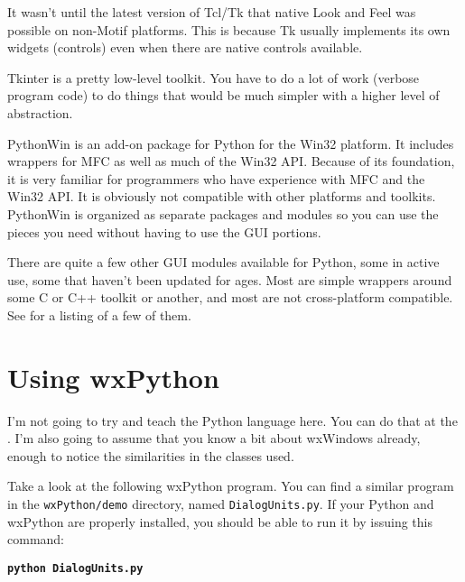 It wasn't until the latest version of Tcl/Tk that native Look and
Feel was possible on non-Motif platforms. This is because Tk
usually implements its own widgets (controls) even when there are
native controls available.

Tkinter is a pretty low-level toolkit. You have to do a lot of work
(verbose program code) to do things that would be much simpler with a higher
level of abstraction.


PythonWin is an add-on package for Python for the Win32 platform. It
includes wrappers for MFC as well as much of the Win32 API. Because
of its foundation, it is very familiar for programmers who have
experience with MFC and the Win32 API. It is obviously not compatible
with other platforms and toolkits. PythonWin is organized as separate
packages and modules so you can use the pieces you need without having
to use the GUI portions.


There are quite a few other GUI modules available for Python, some in
active use, some that haven't been updated for ages. Most are simple
wrappers around some C or C++ toolkit or another, and most are not
cross-platform compatible. See 
for a listing of a few of them.


\section{Using wxPython}\label{wxpusing}


I'm not going to try and teach the Python language here. You can do
that at the .
I'm also going to assume that you know a bit about wxWindows already,
enough to notice the similarities in the classes used.

Take a look at the following wxPython program. You can find a similar
program in the {\tt wxPython/demo} directory, named {\tt DialogUnits.py}. If your
Python and wxPython are properly installed, you should be able to run
it by issuing this command:

\begin{indented}{1cm}
    {\bf\tt python DialogUnits.py}
\end{indented}

